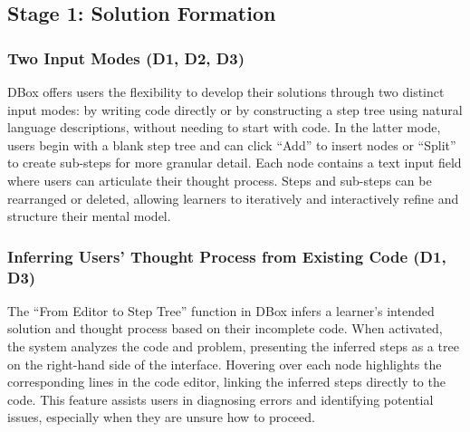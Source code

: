 






\subsection{Stage 1: Solution Formation}
\subsubsection{Two Input Modes (D1, D2, D3)}
DBox offers users the flexibility to develop their solutions through two distinct input modes: by writing code directly or by constructing a step tree using natural language descriptions, without needing to start with code. In the latter mode, users begin with a blank step tree and can click ``Add'' to insert nodes or ``Split'' to create sub-steps for more granular detail. Each node contains a text input field where users can articulate their thought process. Steps and sub-steps can be rearranged or deleted, allowing learners to iteratively and interactively refine and structure their mental model.

\subsubsection{Inferring Users' Thought Process from Existing Code (D1, D3)}
The ``From Editor to Step Tree'' function in DBox infers a learner’s intended solution and thought process based on their incomplete code. When activated, the system analyzes the code and problem, presenting the inferred steps as a tree on the right-hand side of the interface. Hovering over each node highlights the corresponding lines in the code editor, linking the inferred steps directly to the code. This feature assists users in diagnosing errors and identifying potential issues, especially when they are unsure how to proceed.


